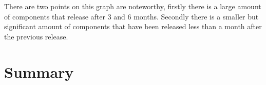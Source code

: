 There are two points on this graph are noteworthy, firstly there is a large amount of components that release after 3 and 6 months.
Secondly there is a smaller but significant amount of components that have been released less than a month after the previous release.


\section{Summary}
